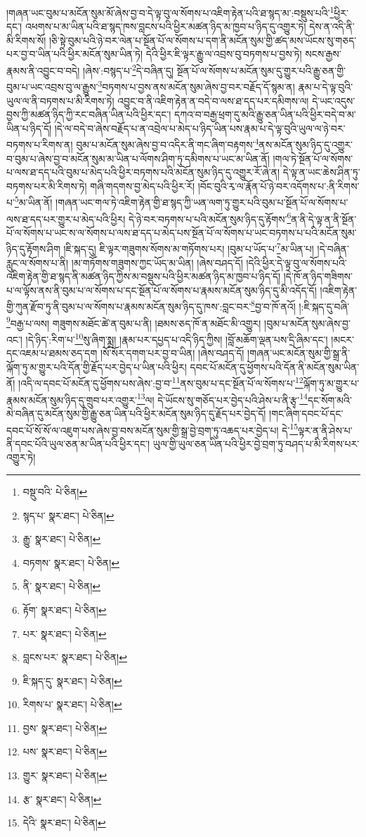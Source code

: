 །གཞན་ཡང་བུམ་པ་མངོན་སུམ་མོ་ཞེས་བྱ་བ་དེ་ལྟ་བུ་ལ་སོགས་པ་འཇིག་རྟེན་པའི་ཐ་སྙད་མ་:བསྡུས་པའི་\footnote{བསྡུ་བའི་  པེ་ཅིན། }ཕྱིར་དང་། འཕགས་པ་མ་ཡིན་པའི་ཐ་སྙད་ཁས་བླངས་པའི་ཕྱིར་མཚན་ཉིད་མ་ཁྱབ་པ་ཉིད་དུ་འགྱུར་ཏེ། དེས་ན་འདི་ནི་མི་རིགས་སོ། །ཅི་སྟེ་བུམ་པའི་ཉེ་བར་ལེན་པ་སྔོན་པོ་ལ་སོགས་པ་དག་ནི་མངོན་སུམ་གྱི་ཚད་མས་ཡོངས་སུ་གཅད་པར་བྱ་བ་ཡིན་པའི་ཕྱིར་མངོན་སུམ་ཡིན་ཏེ། དེའི་ཕྱིར་ཇི་ལྟར་རྒྱུ་ལ་འབྲས་བུ་བཏགས་པ་བྱས་ཏེ། སངས་རྒྱས་རྣམས་ནི་འབྱུང་བ་བདེ། །ཞེས་:བསྙད་པ་\footnote{སྙད་པ་  སྣར་ཐང་།  པེ་ཅིན། }དེ་བཞིན་དུ། སྔོན་པོ་ལ་སོགས་པ་མངོན་སུམ་དུ་གྱུར་པའི་རྒྱུ་ཅན་གྱི་བུམ་པ་ཡང་འབྲས་བུ་ལ་རྒྱུས་\footnote{རྒྱུ་  སྣར་ཐང་།  པེ་ཅིན། }བཏགས་པ་བྱས་ནས་མངོན་སུམ་ཞེས་བྱ་བར་བརྗོད་དོ་སྙམ་ན། རྣམ་པ་དེ་ལྟ་བུའི་ཡུལ་ལ་ནི་བཏགས་པ་མི་རིགས་ཏེ། འབྱུང་བ་ནི་འཇིག་རྟེན་ན་བདེ་བ་ལས་ཐ་དད་པར་དམིགས་ལ། དེ་ཡང་འདུས་བྱས་ཀྱི་མཚན་ཉིད་ཀྱི་རང་བཞིན་ཡིན་པའི་ཕྱིར་དང་། དཀའ་བ་བརྒྱ་ཕྲག་དུ་མའི་རྒྱུ་ཅན་ཡིན་པའི་ཕྱིར་བདེ་བ་མ་ཡིན་པ་ཉིད་དོ། །དེ་ལ་བདེ་བ་ཞེས་བརྗོད་པ་ན་འབྲེལ་པ་མེད་པ་ཉིད་ཡིན་པས་རྣམ་པ་དེ་ལྟ་བུའི་ཡུལ་ལ་ཉེ་བར་བཏགས་པ་རིགས་ན། བུམ་པ་མངོན་སུམ་ཞེས་བྱ་བ་འདིར་ནི་གང་ཞིག་བརྟགས་\footnote{བཏགས་  སྣར་ཐང་།  པེ་ཅིན། }ནས་མངོན་སུམ་ཉིད་དུ་འགྱུར་བ་བུམ་པ་ཞེས་བྱ་བ་མངོན་སུམ་མ་ཡིན་པ་ལོགས་ཤིག་ཏུ་དམིགས་པ་ཡང་མ་ཡིན་ནོ། །གལ་ཏེ་སྔོན་པོ་ལ་སོགས་པ་ལས་ཐ་དད་པའི་བུམ་པ་མེད་པའི་ཕྱིར་བཏགས་པའི་མངོན་སུམ་ཉིད་དུ་འགྱུར་རོ་ཞེ་ན། དེ་ལྟ་ན་ཡང་ཆེས་ཤིན་ཏུ་བཏགས་པར་མི་རིགས་ཏེ། གཞི་གདགས་བྱ་མེད་པའི་ཕྱིར་རོ། །བོང་བུའི་རྭ་ལ་རྣོན་པོ་ཉེ་བར་འདོགས་པ་:ནི་རིགས་པ་\footnote{ནི་  སྣར་ཐང་།  པེ་ཅིན། }མ་ཡིན་ནོ། །གཞན་ཡང་གལ་ཏེ་འཇིག་རྟེན་གྱི་ཐ་སྙད་ཀྱི་ཡན་ལག་ཏུ་གྱུར་པའི་བུམ་པ་སྔོན་པོ་ལ་སོགས་པ་ལས་ཐ་དད་པར་གྱུར་པ་མེད་པའི་ཕྱིར། དེ་ཉེ་བར་བཏགས་པ་པའི་མངོན་སུམ་ཉིད་དུ་རྟོགས་\footnote{རྟོག་  སྣར་ཐང་།  པེ་ཅིན། }ན་ནི་དེ་ལྟ་ན་ནི་སྔོན་པོ་ལ་སོགས་པ་ཡང་ས་ལ་སོགས་པ་ལས་ཐ་དད་པ་མེད་པས་སྔོན་པོ་ལ་སོགས་པ་ཡང་བཏགས་པ་པའི་མངོན་སུམ་ཉིད་དུ་རྟོགས་ཤིག །ཇི་སྐད་དུ། ཇི་ལྟར་གཟུགས་སོགས་མ་གཏོགས་པར། །བུམ་པ་ཡོད་པ་\footnote{པར་  སྣར་ཐང་།  པེ་ཅིན། }མ་ཡིན་པ། །དེ་བཞིན་རླུང་ལ་སོགས་པ་ནི། །མ་གཏོགས་གཟུགས་ཀྱང་ཡོད་མ་ཡིན། །ཞེས་བཤད་དོ། །དེའི་ཕྱིར་དེ་ལྟ་བུ་ལ་སོགས་པའི་འཇིག་རྟེན་གྱི་ཐ་སྙད་ནི་མཚན་ཉིད་ཀྱིས་མ་བསྡུས་པའི་ཕྱིར་མཚན་ཉིད་མ་ཁྱབ་པ་ཉིད་དོ། །དེ་ཁོ་ན་ཉིད་གཟིགས་པ་ལ་ལྟོས་ནས་ནི་བུམ་པ་ལ་སོགས་པ་དང་སྔོན་པོ་ལ་སོགས་པ་རྣམས་མངོན་སུམ་ཉིད་དུ་མི་འདོད་དོ། །འཇིག་རྟེན་གྱི་ཀུན་རྫོབ་ཏུ་ནི་བུམ་པ་ལ་སོགས་པ་རྣམས་མངོན་སུམ་ཉིད་དུ་ཁས་:བླང་བར་\footnote{བླངས་པར་  སྣར་ཐང་།  པེ་ཅིན། }བྱ་བ་ཁོ་ནའོ། །:ཇི་སྐད་དུ་བཞི་\footnote{ཇི་སྐད་དུ་  སྣར་ཐང་།  པེ་ཅིན། }བརྒྱ་པ་ལས། གཟུགས་མཐོང་ཚེ་ན་བུམ་པ་ནི། །ཐམས་ཅད་ཁོ་ན་མཐོང་མི་འགྱུར། །བུམ་པ་མངོན་སུམ་ཞེས་བྱ་འང་། །དེ་ཉིད་:རིག་པ་\footnote{རིགས་པ་  སྣར་ཐང་།  པེ་ཅིན། }སུ་ཞིག་སྨྲ། །རྣམ་པར་དཔྱད་པ་འདི་ཉིད་ཀྱིས། །བློ་མཆོག་ལྡན་པས་དྲི་ཞིམ་དང་། །མངར་དང་འཇམ་པ་ཐམས་ཅད་དག །སོ་སོར་དགག་པར་བྱ་བ་ཡིན། །ཞེས་བཤད་དོ། །གཞན་ཡང་མངོན་སུམ་གྱི་སྒྲ་ནི་ལྐོག་ཏུ་མ་གྱུར་པའི་དོན་གྱི་རྗོད་པར་བྱེད་པ་ཡིན་པའི་ཕྱིར། དབང་པོ་མངོན་དུ་ཕྱོགས་པའི་དོན་ནི་མངོན་སུམ་ཡིན་ནོ། །འདི་ལ་དབང་པོ་མངོན་དུ་ཕྱོགས་པས་ཞེས་:བྱ་བ་\footnote{བྱས་  སྣར་ཐང་།  པེ་ཅིན། }ནས་བུམ་པ་དང་སྔོན་པོ་ལ་སོགས་པ་\footnote{པས་  སྣར་ཐང་།  པེ་ཅིན། }ལྐོག་ཏུ་མ་གྱུར་པ་རྣམས་མངོན་སུམ་ཉིད་དུ་གྲུབ་པར་འགྱུར་\footnote{གྱུར་  སྣར་ཐང་།  པེ་ཅིན། }ལ། དེ་ཡོངས་སུ་གཅོད་པར་བྱེད་པའི་ཤེས་པ་ནི་རྩྭ་\footnote{རྩ་  སྣར་ཐང་།  པེ་ཅིན། }དང་སོག་མའི་མེ་བཞིན་དུ་མངོན་སུམ་གྱི་རྒྱུ་ཅན་ཡིན་པའི་ཕྱིར་མངོན་སུམ་ཉིད་དུ་རྗོད་པར་བྱེད་དོ། །གང་ཞིག་དབང་པོ་དང་དབང་པོ་སོ་སོ་ལ་འཇུག་པས་ཞེས་བྱ་བས་མངོན་སུམ་གྱི་སྒྲ་བྱེ་བྲག་ཏུ་འཆད་པར་བྱེད་པ། དེ་\footnote{དེའི་  སྣར་ཐང་།  པེ་ཅིན། }ལྟར་ན་ནི་ཤེས་པ་ནི་དབང་པོའི་ཡུལ་ཅན་མ་ཡིན་པའི་ཕྱིར་དང་། ཡུལ་གྱི་ཡུལ་ཅན་ཡིན་པའི་ཕྱིར་བྱེ་བྲག་ཏུ་བཤད་པ་མི་རིགས་པར་འགྱུར་ཏེ། 